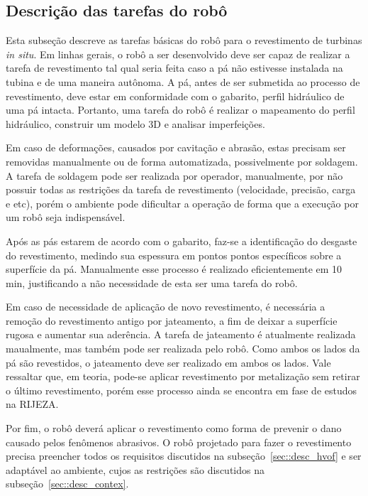 \subsection{Descrição das tarefas do robô}
\label{desc_taref}
Esta subseção descreve as tarefas básicas do robô para o revestimento de
turbinas \textit{in situ}. Em linhas gerais, o robô a ser desenvolvido deve ser
capaz de realizar a tarefa de revestimento tal qual seria feita caso a pá não estivesse instalada na
tubina e de uma maneira autônoma. A pá, antes de ser submetida ao
processo de revestimento, deve estar em conformidade com o gabarito, perfil hidráulico de uma pá
intacta. Portanto, uma tarefa do robô é realizar o mapeamento do perfil
hidráulico, construir um modelo 3D e analisar imperfeições.

Em caso de deformações, causados por cavitação e abrasão, estas precisam
ser removidas manualmente ou de forma automatizada, possivelmente por
soldagem. A tarefa de soldagem pode
ser realizada por operador, manualmente, por não possuir todas as restrições
da tarefa de revestimento (velocidade, precisão, carga e etc), porém o ambiente
pode dificultar a operação de forma que a execução por um robô seja
indispensável. 

Após as pás estarem de acordo com o gabarito, faz-se a
identificação do desgaste do revestimento, medindo sua espessura em pontos
pontos específicos sobre a superfície da pá. Manualmente esse
processo é realizado eficientemente em 10 min, justificando a não necessidade de
esta ser uma tarefa do robô. 

Em caso de necessidade de aplicação
de novo revestimento, é necessária a remoção do revestimento antigo por
jateamento, a fim de deixar a superfície rugosa e aumentar sua aderência. A
tarefa de jateamento é atualmente realizada maualmente, mas também pode ser
realizada pelo robô. Como ambos os lados da pá são revestidos, o jateamento deve
ser realizado em ambos os lados. Vale ressaltar que, em teoria, pode-se aplicar revestimento por metalização sem retirar o último revestimento,
porém esse processo ainda se encontra em fase de estudos na RIJEZA.

Por fim, o robô deverá aplicar o revestimento como
forma de prevenir o dano causado pelos fenômenos abrasivos. O robô projetado
para fazer o revestimento precisa preencher todos os requisitos discutidos na
subseção~\ref{sec::desc_hvof} e ser adaptável ao ambiente, cujos as restrições
são discutidos na subseção~\ref{sec::desc_contex}. 

